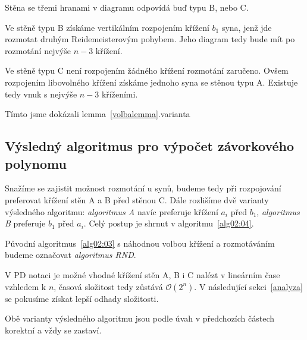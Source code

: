 Stěna se třemi hranami v diagramu odpovídá buď typu B, nebo C.

Ve stěně typu B získáme vertikálním rozpojením křížení $b_1$ syna, jenž jde rozmotat druhým Reidemeisterovým pohybem. Jeho diagram tedy bude mít po rozmotání nejvýše $n-3$ křížení.

Ve stěně typu C není rozpojením žádného křížení rozmotání zaručeno. Ovšem rozpojením libovolného křížení získáme jednoho syna se stěnou typu A. Existuje tedy vnuk s nejvýše $n-3$ kříženími.

Tímto jsme dokázali lemma~\ref{volbalemma}.varianta

\subsection{Výsledný algoritmus pro výpočet závorkového polynomu} \label{varianty}
Snažíme se zajistit možnost rozmotání u synů, budeme tedy při rozpojování preferovat křížení stěn A a B před stěnou C. Dále rozlišíme dvě varianty výsledného algoritmu: \emph{algoritmus A} navíc preferuje křížení $a_i$ před $b_1$,  \emph{algoritmus B} preferuje $b_1$ před $a_i$. Celý postup je shrnut v algoritmu~\ref{alg02:04}.

Původní algoritmus~\ref{alg02:03} s náhodnou volbou křížení a rozmotáváním budeme označovat \emph{algoritmus RND}.

V PD notaci je možné vhodné křížení stěn A, B i C nalézt v lineárním čase vzhledem k $n$, časová složitost tedy zůstává $\mathcal{O}(2^n)$. V následující sekci~\ref{analyza} se pokusíme získat lepší odhady složitosti.

Obě varianty výsledného algoritmu jsou podle úvah v předchozích částech korektní a vždy se zastaví.

